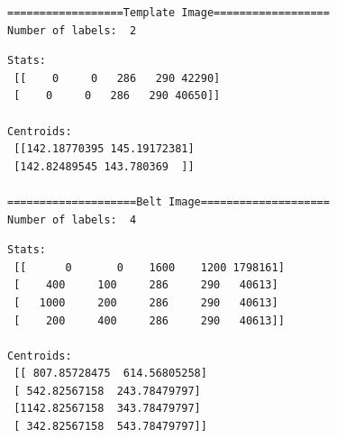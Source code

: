 \documentclass[a4paper,11pt]{article}%
\begin{document}
\begin{figure}[!h]
	\centering
\end{figure}


    \begin{Verbatim}[commandchars=\\\{\}]
==================Template Image==================
Number of labels:  2
    \end{Verbatim}


    \begin{Verbatim}[commandchars=\\\{\}]
Stats:
 [[    0     0   286   290 42290]
 [    0     0   286   290 40650]]

Centroids:
 [[142.18770395 145.19172381]
 [142.82489545 143.780369  ]]

====================Belt Image====================
Number of labels:  4
    \end{Verbatim}


    \begin{Verbatim}[commandchars=\\\{\}]
Stats:
 [[      0       0    1600    1200 1798161]
 [    400     100     286     290   40613]
 [   1000     200     286     290   40613]
 [    200     400     286     290   40613]]

Centroids:
 [[ 807.85728475  614.56805258]
 [ 542.82567158  243.78479797]
 [1142.82567158  343.78479797]
 [ 342.82567158  543.78479797]]

    \end{Verbatim}
\end{document}
